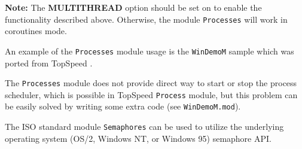     {\bf Note:} The {\bf MULTITHREAD} option should be set on to enable the
    functionality described above. Otherwise, the module \verb'Processes' will
    work in coroutines mode.

    An example of the \verb'Processes' module usage is the \verb'WinDemoM'
    sample which was ported from TopSpeed \mt{}.

    The \verb'Processes' module does not provide direct way to start or stop the
    process scheduler, which is possible in TopSpeed \verb'Process' module, but this
    problem can be easily solved by writing some extra code (see \verb'WinDemoM.mod').

    The ISO standard module \verb'Semaphores' can be used to utilize the underlying
    operating system (OS/2, Windows NT, or Windows 95) semaphore API.


